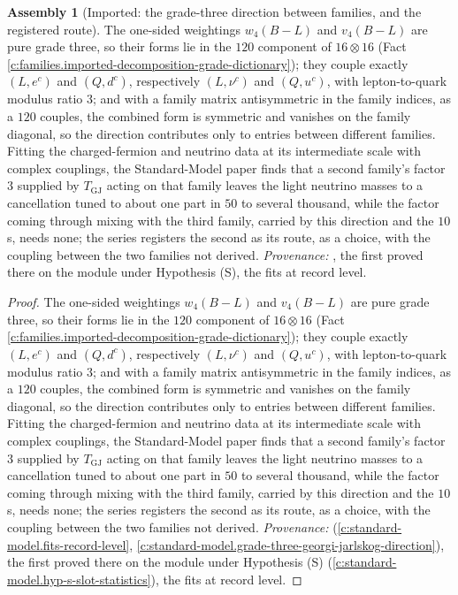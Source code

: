 \documentclass[11pt]{article}
\theoremstyle{definition}
\newtheorem{assembled}[theorem]{Assembly}
\theoremstyle{plain}
\begin{document}
\begin{assembled}[Imported: the grade-three direction between families, and the registered route]\label{c:families.imported-grade-three-direction-between-families}
The one-sided weightings $w_{4}(B - L)$ and $v_{4}(B - L)$ are pure grade three, so their forms lie in the $120$ component of $16 \otimes 16$ (Fact \ref{c:families.imported-decomposition-grade-dictionary}); they couple exactly $(L, e^{c})$ and $(Q, d^{c})$, respectively $(L, \nu^{c})$ and $(Q, u^{c})$, with lepton-to-quark modulus ratio $3$; and with a family matrix antisymmetric in the family indices, as a $120$ couples, the combined form is symmetric and vanishes on the family diagonal, so the direction contributes only to entries between different families. Fitting the charged-fermion and neutrino data at its intermediate scale with complex couplings, the Standard-Model paper finds that a second family's factor $3$ supplied by $T_{\mathrm{GJ}}$ acting on that family leaves the light neutrino masses to a cancellation tuned to about one part in $50$ to several thousand, while the factor coming through mixing with the third family, carried by this direction and the $10$s, needs none; the series registers the second as its route, as a choice, with the coupling between the two families not derived. \emph{Provenance:} \cite[Prop.~11.6, Obs.~11.7, Rem.~11.8]{ButlerT12}, the first proved there on the module under Hypothesis (S), the fits at record level.
\end{assembled}
\begin{proof}
The one-sided weightings $w_{4}(B - L)$ and $v_{4}(B - L)$ are pure grade three, so their forms lie in the $120$ component of $16 \otimes 16$ (Fact \ref{c:families.imported-decomposition-grade-dictionary}); they couple exactly $(L, e^{c})$ and $(Q, d^{c})$, respectively $(L, \nu^{c})$ and $(Q, u^{c})$, with lepton-to-quark modulus ratio $3$; and with a family matrix antisymmetric in the family indices, as a $120$ couples, the combined form is symmetric and vanishes on the family diagonal, so the direction contributes only to entries between different families. Fitting the charged-fermion and neutrino data at its intermediate scale with complex couplings, the Standard-Model paper finds that a second family's factor $3$ supplied by $T_{\mathrm{GJ}}$ acting on that family leaves the light neutrino masses to a cancellation tuned to about one part in $50$ to several thousand, while the factor coming through mixing with the third family, carried by this direction and the $10$s, needs none; the series registers the second as its route, as a choice, with the coupling between the two families not derived. \emph{Provenance:} \cite[Prop.~11.6, Obs.~11.7, Rem.~11.8]{ButlerT12} (\ref{c:standard-model.fits-record-level}, \ref{c:standard-model.grade-three-georgi-jarlskog-direction}), the first proved there on the module under Hypothesis (S) (\ref{c:standard-model.hyp-s-slot-statistics}), the fits at record level.

\end{proof}
\end{document}

